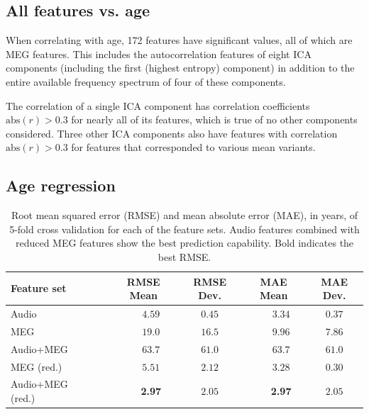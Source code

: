 \documentclass[utf8]{frontiersSCNS} %
\begin{document}
\subsection{All features vs. age}

When correlating with age, 172 features have significant values, all of which are MEG features. This includes the autocorrelation features of eight ICA components (including the first (highest entropy) component) in addition to the entire available frequency spectrum of four of these components.

The correlation of a single ICA component has correlation coefficients $\text{abs}(r)>0.3$ for nearly all of its features, which is true of no other components considered. Three other ICA components also have features with correlation $\text{abs}(r)>0.3$  for features that corresponded to various mean variants.

\subsection{Age regression}

\begin{table}[htp]
  \centering
   \caption{Root mean squared error (RMSE) and mean absolute error (MAE), in years, of 5-fold cross validation for each of the feature sets. Audio features combined with reduced MEG features show the best prediction capability. Bold indicates the best RMSE.}
  \begin{tabular}{ l | c | c | c | c }
    \toprule
    \textbf{Feature set} & \textbf{RMSE Mean} & \textbf{RMSE Dev.} & \textbf{MAE Mean} & \textbf{MAE Dev.}       \\
    \toprule
        Audio~~~                             & ~~~$4.59$         &     $0.45$     & ~~~$3.34$         &     $0.37$       \\
        MEG~~~                               & ~~~$19.0$         &     $16.5$     & ~~~$9.96$         &     $7.86$       \\
        Audio+MEG~~~                         & ~~~$63.7$         &     $61.0$     & ~~~$63.7$         &     $61.0$       \\

        \midrule
       
        MEG (red.)~~~                        & ~~~$5.51$         &     $2.12$    & ~~~$3.28$          &     $0.30$       \\
        Audio+MEG (red.)~~~                  & ~~~\textbf{2.97}  &     $2.05$    & ~~~\textbf{2.97}         &     $2.05$      \\

    \hline
  \end{tabular}
  \label{tab:reg_results}
\end{table}
\end{document}
